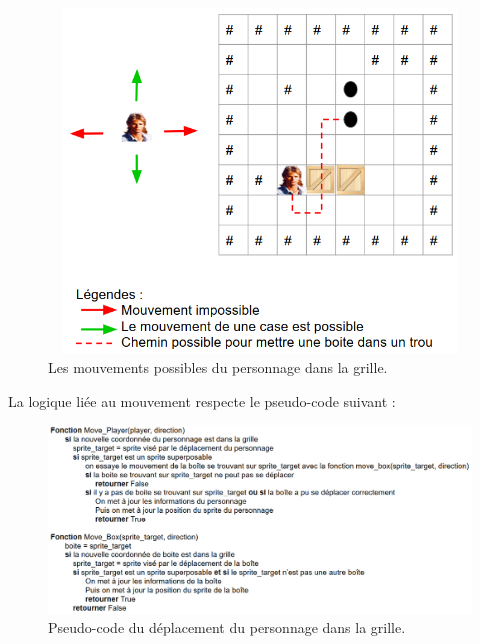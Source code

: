 \documentclass[a4paper,12pt]{article}
\begin{document}
\begin{figure}[H]
\begin{center}
\includegraphics[width=6in, height=3.6in]{./Illustrations/mouv_1.png}
\end{center}
\caption{Les mouvements possibles du personnage dans la grille.}
\end{figure}

La logique liée au mouvement respecte le pseudo-code suivant : 

\begin{figure}[H]
\includegraphics[width=\linewidth]{./Illustrations/mouv_2.png}
\caption{Pseudo-code du déplacement du personnage dans la grille.}
\end{figure}
\end{document}
